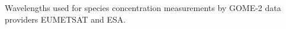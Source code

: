 \label{fig:gomeproducts}

Wavelengths used for species concentration measurements by GOME-2 data providers EUMETSAT and ESA.